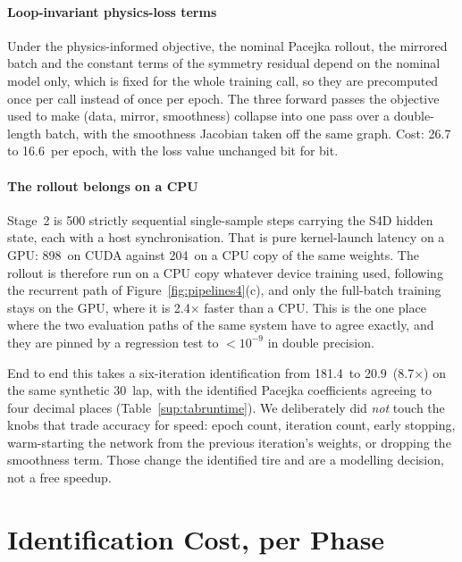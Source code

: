 \documentclass[12pt]{sn-jnl}
\makeatletter
\newif\ifsiu@prev
\DeclareRobustCommand{\siu@sep}{\ifsiu@prev\,\fi}
\DeclareRobustCommand{\siu@unit}[1]{\siu@sep\text{#1}\siu@prevtrue}
\DeclareRobustCommand{\siu@pre}[1]{\siu@sep\text{#1}\siu@prevfalse}
\DeclareRobustCommand{\siu@div}[1]{\text{#1}\siu@prevfalse}
\DeclareRobustCommand{\meter}{m}
\DeclareRobustCommand{\second}{s}
\DeclareRobustCommand{\gram}{g}
\DeclareRobustCommand{\newton}{N}
\DeclareRobustCommand{\radian}{rad}
\DeclareRobustCommand{\hertz}{Hz}
\DeclareRobustCommand{\percent}{\%}
\DeclareRobustCommand{\g}{\textit{g}}
\DeclareRobustCommand{\kilo}{k}
\DeclareRobustCommand{\milli}{m}
\DeclareRobustCommand{\per}{/}
\DeclareRobustCommand{\squared}{\ensuremath{^{2}}}
\providecommand{\degree}{\ensuremath{^{\circ}}}
\DeclareRobustCommand{\si}[1]{\begingroup
  \siu@prevfalse
  \renewcommand{\meter}{\siu@unit{m}}%
  \renewcommand{\second}{\siu@unit{s}}%
  \renewcommand{\gram}{\siu@unit{g}}%
  \renewcommand{\newton}{\siu@unit{N}}%
  \renewcommand{\radian}{\siu@unit{rad}}%
  \renewcommand{\hertz}{\siu@unit{Hz}}%
  \renewcommand{\percent}{\siu@unit{\%}}%
  \renewcommand{\degree}{\siu@unit{\ensuremath{^{\circ}}}}%
  \renewcommand{\g}{\siu@unit{\textit{g}}}%
  \renewcommand{\kilo}{\siu@pre{k}}%
  \renewcommand{\milli}{\siu@pre{m}}%
  \renewcommand{\per}{\siu@div{/}}%
  \renewcommand{\squared}{\ensuremath{^{2}}}%
  #1\endgroup}
\DeclareRobustCommand{\num}[1]{#1}
\DeclareRobustCommand{\SI}[2]{#1\,\si{#2}}
\makeatother
\begin{document}
\paragraph{Loop-invariant physics-loss terms}
Under the physics-informed objective, the nominal Pacejka rollout, the mirrored
batch and the constant terms of the symmetry residual depend on the nominal
model only, which is fixed for the whole training call, so they are precomputed
once per call instead of once per epoch. The three forward passes the objective
used to make (data, mirror, smoothness) collapse into one pass over a
double-length batch, with the smoothness Jacobian taken off the same graph.
Cost: \SI{26.7}{\milli\second} to \SI{16.6}{\milli\second} per epoch, with the
loss value unchanged bit for bit.

\paragraph{The rollout belongs on a CPU}
Stage~2 is 500 strictly sequential single-sample steps carrying the S4D hidden
state, each with a host synchronisation. That is pure kernel-launch latency on
a GPU: \SI{898}{\milli\second} on CUDA against \SI{204}{\milli\second} on a CPU
copy of the same weights. The rollout is therefore run on a CPU copy whatever
device training used, following the recurrent path of
Figure~\ref{fig:pipelines4}(c), and only the full-batch training stays on the
GPU, where it is \num{2.4}$\times$ faster than a CPU. This is the one place where the two evaluation paths of the
same system have to agree exactly, and they are pinned by a regression test to
$<10^{-9}$ in double precision.

End to end this takes a six-iteration identification from \SI{181.4}{\second}
to \SI{20.9}{\second} (\num{8.7}$\times$) on the same synthetic
\SI{30}{\second} lap, with the identified Pacejka coefficients agreeing to four
decimal places (Table~\ref{sup:tabruntime}). We deliberately did \emph{not}
touch the knobs that trade accuracy for speed: epoch count, iteration count,
early stopping, warm-starting the network from the previous iteration's
weights, or dropping the smoothness term. Those change the identified tire and
are a modelling decision, not a free speedup.

\section{Identification Cost, per Phase}
\label{sup:runtime}
\end{document}
